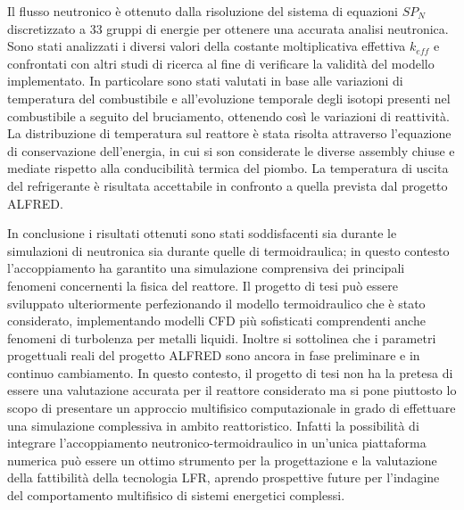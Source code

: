 Il flusso neutronico è ottenuto dalla risoluzione del sistema di equazioni
$SP_N$ discretizzato a 33 gruppi di energie per ottenere una accurata analisi neutronica. 
Sono stati analizzati i diversi valori della costante moltiplicativa effettiva $k_{eff}$ e 
confrontati con altri studi di ricerca al fine di verificare la validità del 
modello implementato. 
In particolare sono stati valutati in base alle variazioni di temperatura del 
combustibile e all'evoluzione temporale degli isotopi presenti nel combustibile 
a seguito del bruciamento, ottenendo così le variazioni di reattività.
La distribuzione di temperatura sul reattore è stata risolta attraverso 
l'equazione di conservazione dell'energia, in cui si son considerate le diverse 
assembly chiuse e mediate rispetto alla conducibilità termica del piombo.
La temperatura di uscita del refrigerante è risultata accettabile in confronto a quella prevista dal progetto 
ALFRED.

In conclusione i risultati ottenuti sono stati soddisfacenti sia durante le simulazioni di neutronica
sia durante quelle di termoidraulica; in questo contesto l'accoppiamento ha garantito una 
simulazione comprensiva dei principali fenomeni concernenti la fisica del reattore.
Il progetto di tesi può essere sviluppato ulteriormente perfezionando il modello  
termoidraulico che è stato considerato, implementando modelli CFD più sofisticati 
comprendenti anche fenomeni di 
turbolenza per metalli liquidi.
Inoltre si sottolinea che i parametri progettuali reali del progetto ALFRED sono ancora in fase 
preliminare e in continuo cambiamento. In questo contesto, il progetto di tesi
non ha la pretesa di essere una valutazione accurata per il reattore considerato ma si pone piuttosto 
lo scopo di presentare un approccio multifisico computazionale in grado di 
effettuare una simulazione complessiva in ambito reattoristico.
Infatti la possibilità di integrare l'accoppiamento neutronico-termoidraulico 
in un'unica piattaforma numerica può essere un ottimo strumento per la progettazione 
e la valutazione della fattibilità della tecnologia LFR, aprendo prospettive 
future per l'indagine del comportamento multifisico di sistemi energetici complessi. 




